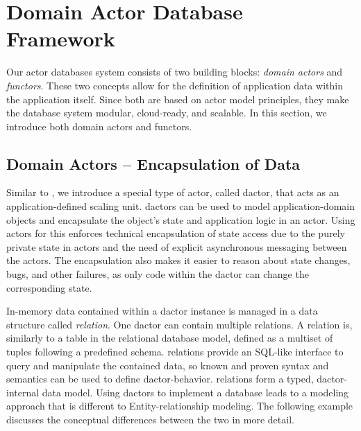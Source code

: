 
\section{Domain Actor Database Framework}\label{sec:concept}
  Our actor databases system consists of two building blocks: \emph{domain actors} and \emph{\glspl{functor}}. These two concepts allow for the definition of application data within the application itself. Since both are based on actor model principles, they make the database system modular, cloud-ready, and scalable. In this section, we introduce both domain actors and \glspl{functor}.
  

  \subsection{Domain Actors -- Encapsulation of Data}\label{sec:dactors}
    Similar to \citet{Shah:reactdb}, we introduce a special type of actor, called \gls{dactor}, that acts as an application-defined scaling unit.
    \Glspl{dactor} can be used to model application-domain objects and encapsulate the object's state and application logic in an actor.
    Using actors for this enforces technical encapsulation of state access due to the purely private state in actors and the need of explicit asynchronous messaging between the actors.
    The encapsulation also makes it easier to reason about state changes, bugs, and other failures, as only code within the \gls{dactor} can change the corresponding state.

    In-memory data contained within a \gls{dactor} instance is managed in a data structure called \emph{\gls{relation}}.
    One \gls{dactor} can contain multiple \glspl{relation}.
    A \gls{relation} is, similarly to a table in the relational database model, defined as a multiset of tuples following a predefined schema.
    \Glspl{relation} provide an SQL-like interface to query and manipulate the contained data, so known and proven syntax and semantics can be used to define \gls{dactor}-behavior.
    \Glspl{relation} form a typed, \gls{dactor}-internal data model.
    Using \glspl{dactor} to implement a database leads to a modeling approach that is different to Entity-relationship modeling.
    The following example discusses the conceptual differences between the two in more detail.

